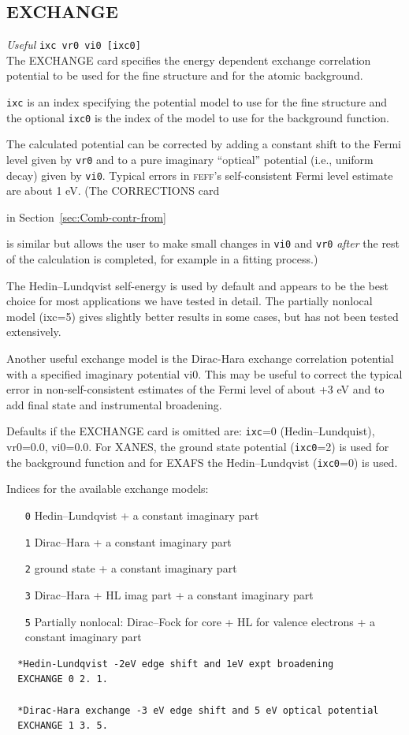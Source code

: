 \documentclass[11pt,oneside]{report} %
\renewcommand{\htmlref}[2]{\hyperlink{#2}{#1}}
\newcommand{\program}[1]{\textsc{#1}}
\newcommand{\feff}{\program{feff}}
\newenvironment{Card}[4]%
      {\vspace{3ex}%
        \subsection{#1}
        \quad\textsl{#3}\newline
        \quad\texttt{#2}\newline%
        \label{card:#4}\\}
      {}
\renewcommand{\htmlref}[2]{{#1}} %
\begin{document}
\begin{Card}{EXCHANGE}{ixc vr0 vi0 [ixc0]}{Useful}{exc}
  The EXCHANGE card specifies the energy dependent exchange
  correlation potential to be used for the fine structure and for the
  atomic background. 

  \texttt{ixc} is an index specifying the
  potential model to use for the fine structure and the optional
  \texttt{ixc0} is the index of the model to use for the background
  function. 

  The calculated potential can be corrected by adding a
  constant shift to the Fermi level given by \texttt{vr0} and to a
  pure imaginary ``optical'' potential (i.e., uniform decay)
  given by \texttt{vi0}. Typical errors in {\feff}'s self-consistent
  Fermi level estimate are about 1 eV. (The
  \htmlref{CORRECTIONS}{card:cor} card 
  \begin{latexonly}
    in Section~\ref{sec:Comb-contr-from}
  \end{latexonly}
  is similar but allows the user to make small changes in \texttt{vi0}
  and \texttt{vr0} {\it after}  the rest of the calculation is completed,
  for example in a fitting process.)  

  The Hedin--Lundqvist self-energy is used by default and appears to be 
  the best choice for most applications we have tested in detail. The
  partially nonlocal model (ixc=5) gives slightly better results in some
  cases, but has not been tested extensively.

  Another useful exchange model is the Dirac-Hara exchange correlation
  potential with a specified imaginary potential vi0. This may be
  useful to correct the typical error in non-self-consistent estimates of
  the Fermi level of about +3 eV and to add final state and
  instrumental broadening.

  Defaults if the EXCHANGE card is omitted are: \texttt{ixc}=0
  (Hedin--Lundquist), vr0=0.0, vi0=0.0. For XANES, the ground state
  potential (\texttt{ixc0}=2) is used for the background function and
  for EXAFS the Hedin--Lundqvist (\texttt{ixc0}=0) is used.

  Indices for the available exchange models:
  \begin{itemize}
    \tightlist
  \item[ \texttt{0}\quad] Hedin--Lundqvist + a constant imaginary part
  \item[ \texttt{1}\quad] Dirac--Hara + a constant imaginary part
  \item[ \texttt{2}\quad] ground state + a constant imaginary part
  \item[ \texttt{3}\quad] Dirac--Hara + HL imag part + a constant
    imaginary part
  \item[ \texttt{5}\quad] Partially nonlocal: Dirac--Fock for core +
    HL for valence electrons + a constant imaginary part
  \end{itemize}
\begin{verbatim}
  *Hedin-Lundqvist -2eV edge shift and 1eV expt broadening
  EXCHANGE 0 2. 1.

  *Dirac-Hara exchange -3 eV edge shift and 5 eV optical potential
  EXCHANGE 1 3. 5.
\end{verbatim}
\end{Card}
\end{document}
